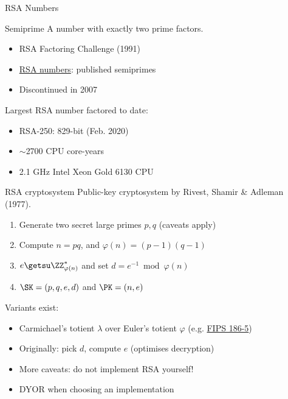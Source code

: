 \begin{frame}{RSA Numbers}
  \pause
  \begin{block}{Semiprime}
    A number with exactly two prime factors.
  \end{block}
  
  \begin{itemize}[<+(1)->]
    \item RSA Factoring Challenge (1991)
    \item \href{https://en.wikipedia.org/wiki/RSA_numbers}{RSA numbers}: published semiprimes
    \item Discontinued in 2007
  \end{itemize}

  \pause
  Largest RSA number factored to date:
  \begin{itemize}[<+(1)->]
    \item RSA-250: 829-bit (Feb. 2020)
    \item $\sim$2700 CPU core-years
    \item 2.1 GHz Intel Xeon Gold 6130 CPU
  \end{itemize}
\end{frame}

\begin{frame}{RSA cryptosystem}
  Public-key cryptosystem by Rivest, Shamir \& Adleman (1977).
  
  \begin{enumerate}[<+(1)->]
    \item Generate two secret large primes $p,q$ (caveats apply)
    \item Compute $n=pq$, and $\varphi(n)=(p-1)(q-1)$
    \item $e \getsu \ZZ_{\varphi(n)}^*$ and set $d = e^{-1} \bmod \varphi(n)$
    \item $\SK=(p,q,e,d)$ and $\PK = (n,e)$
  \end{enumerate}

  \pause
  Variants exist:
  \begin{itemize}[<+(1)->]
    \item Carmichael's totient $\lambda$ over Euler's totient $\varphi$ (e.g. \href{https://csrc.nist.gov/pubs/fips/186-5/final}{FIPS 186-5})
    \item Originally: pick $d$, compute $e$ (optimises decryption)
    \item More caveats: do not implement RSA yourself!
    \item DYOR when choosing an implementation
  \end{itemize}
\end{frame}


